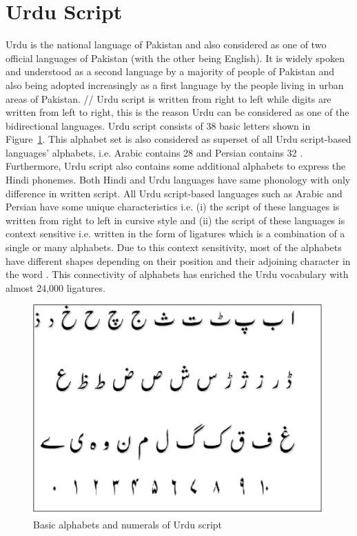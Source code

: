 \section{Urdu Script}\label{UrduSC}
Urdu is the national language of Pakistan and also considered as one of two official languages of Pakistan \cite{60} (with the other being English). It is widely spoken and understood as a second language by a majority of people of Pakistan \cite{1,2} and also being adopted increasingly as a first language by the people living in urban areas of Pakistan. //
Urdu script is written from right to left while digits are written from left to right, this is the reason Urdu can be considered as one of the bidirectional languages. Urdu script consists of 38 basic letters shown in Figure~\ref{fig1}. This alphabet set is also considered as superset of all Urdu script-based languages’ alphabets, i.e. Arabic contains 28 and Persian contains 32 \cite{4}. Furthermore, Urdu script also contains some additional alphabets to express the Hindi phonemes. Both Hindi and Urdu languages \cite{4} have same phonology with only difference in written script. All Urdu script-based languages such as Arabic and Persian have some unique characteristics i.e. (i) the script of these languages is written from right to left in cursive style and (ii) the script of these languages is context sensitive i.e. written in the form of ligatures which is a combination of a single or many alphabets. Due to this context sensitivity, most of the alphabets have different shapes depending on their position and their adjoining character in the word \cite{5}. This connectivity of alphabets \cite{6} has enriched the Urdu vocabulary with almost 24,000 ligatures. \\
\begin{figure}
\centering
	\includegraphics[width=8.cm]{Urdu_alphabets.jpg}
\caption{Basic alphabets and numerals of Urdu script}\label{fig1}
\end{figure}
